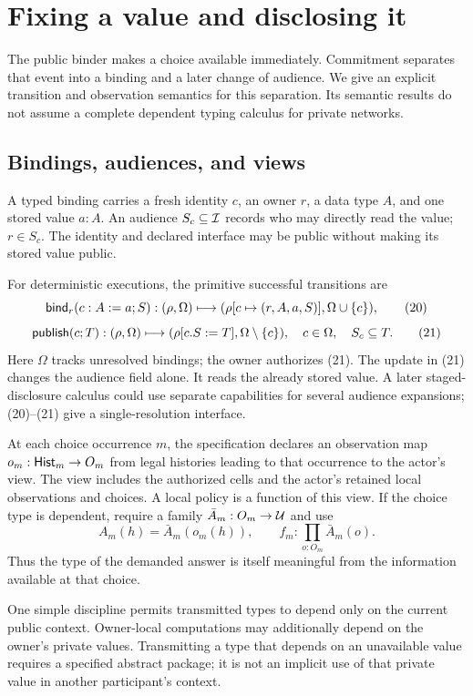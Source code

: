 \section{Fixing a value and disclosing it}
\label{sec:disclosure}

The public binder makes a choice available immediately. Commitment separates
that event into a binding and a later change of audience. We give an explicit
transition and observation semantics for this separation. Its semantic results
do not assume a complete dependent typing calculus for private networks.

\subsection{Bindings, audiences, and views}

A typed binding carries a fresh identity $c$, an owner $r$, a data type $A$,
and one stored value $a:A$. An audience $S_c\subseteq\mathcal I$ records who may
directly read the value; $r\in S_c$. The identity and declared interface may
be public without making its stored value public.

For deterministic executions, the primitive successful transitions are
\[
 \mathsf{bind}_r(c:A:=a;S):
       (\rho,\Omega)\longmapsto
       (\rho[c\mapsto(r,A,a,S)],\Omega\cup\{c\}),
 \tag{20}
\]
\[
 \mathsf{publish}(c;T):
       (\rho,\Omega)\longmapsto
       (\rho[c.S:=T],\Omega\setminus\{c\}),
 \quad c\in\Omega,\quad S_c\subseteq T.
 \tag{21}
\]
Here $\Omega$ tracks unresolved bindings; the owner authorizes (21). The
update in (21) changes the audience field alone. It reads the already stored
value. A later staged-disclosure calculus could use separate capabilities for
several audience expansions; (20)--(21) give a single-resolution interface.

At each choice occurrence $m$, the specification declares an observation map
$o_m:\mathsf{Hist}_m\to O_m$ from legal histories leading to that occurrence to the
actor's view.
The view includes the authorized cells and the actor's retained local
observations and choices. A local policy is a function of this view. If the
choice type is dependent, require a family $\bar A_m:O_m\to\mathcal U$ and use
\[
 A_m(h)=\bar A_m(o_m(h)),\qquad
 f_m:\prod_{o:O_m}\bar A_m(o).
 \tag{22}
\]
Thus the type of the demanded answer is itself meaningful from the information
available at that choice.

One simple discipline permits transmitted types to depend only on the current
public context. Owner-local computations may additionally depend on the
owner's private values. Transmitting a type that depends on an unavailable
value requires a specified abstract package; it is not an implicit use of
that private value in another participant's context.

